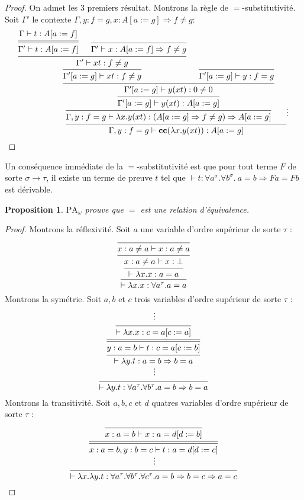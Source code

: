 \documentclass[a4paper,12pt]{article}
\newtheorem{prop}[theo]{Proposition}
\theoremstyle{rmqstyle}
\newcommand{\PA}{\mathrm{PA}}
\renewcommand{\implies}{\Rightarrow}
\newcommand{\cc}{\mathbf{cc}}
\begin{document}
\begin{proof} 
On admet les 3 premiers résultat. Montrons la règle de $=$-substitutivité. Soit $\Gamma'$ le contexte $\Gamma, y : f = g, x : A[a := g] \implies f \neq g$:
$$
\begin{prooftree}[center=false]
\hypo{\Gamma \vdash t : A[a := f]}
\infer[double]1{\Gamma' \vdash t : A[a := f]}
\infer0{\Gamma' \vdash x : A[a := f] \implies f \neq g}
\infer2{\Gamma' \vdash xt : f \neq g}
\infer1{\Gamma'[a := g] \vdash xt : f \neq g}
\infer0{\Gamma'[a := g] \vdash y : f = g}
\infer2{\Gamma'[a := g] \vdash y(xt) : 0 \neq 0}
\infer1{\Gamma'[a := g] \vdash y(xt) : A[a := g]}
\infer1{\Gamma, y : f = g \vdash \lambda x. y(xt) : (A[a := g] \implies f \neq g) \implies A[a := g]}
\hypo{}
\ellipsis{}{}
\infer2{\Gamma, y : f = g \vdash \cc(\lambda x. y(xt)) : A[a := g]}
\end{prooftree}
$$
\end{proof}

Un conséquence immédiate de la $=$-substitutivité est que pour tout terme $F$ de sorte $\sigma \to \tau$, il existe un terme de preuve $t$ tel que $\vdash t : \forall a^\sigma. \forall b^\sigma. \ a = b \implies Fa = Fb$ est dérivable. 

\begin{prop}
$\PA_\omega$ prouve que $=$ est une relation d'équivalence.
\end{prop}

\begin{proof}
Montrons la réflexivité. Soit $a$ une variable d'ordre supérieur de sorte $\tau$ :
$$
\begin{prooftree}[center=false]
\infer0{ x : a \neq a \vdash x : a \neq a}
\infer1{x : a \neq a \vdash x : \bot}
\infer1{\vdash \lambda x. x : a = a}
\infer1{\vdash \lambda x. x : \forall a^\tau. a = a}
\end{prooftree}
$$
Montrons la symétrie. Soit $a, b$ et $c$ trois variables d'ordre supérieur de sorte $\tau$ :
$$
\begin{prooftree}[center=false]
\hypo{}
\ellipsis{}{}
\infer1{\vdash \lambda x.x : c = a[c := a]}
\infer[double]1{y : a = b \vdash t : c = a[c := b]}
\infer1{\vdash \lambda y. t : a = b \implies b = a}
\ellipsis{}{}
\infer1{\vdash \lambda y. t : \forall a^\tau. \forall b^\tau. a = b \implies b = a}
\end{prooftree}
$$
Montrons la transitivité. Soit $a, b, c$ et $d$ quatres variables d'ordre supérieur de sorte $\tau$ :
$$
\begin{prooftree}[center=false]
\infer0{x : a = b \vdash x : a = d[d := b]}
\infer[double]1{x : a = b, y : b = c \vdash t : a = d[d := c]}
\ellipsis{}{}
\infer1{\vdash \lambda x. \lambda y. t : \forall a^\tau. \forall b^\tau. \forall c^\tau. a = b \implies b = c \implies a = c}
\end{prooftree}
$$
\end{proof}
\end{document}
